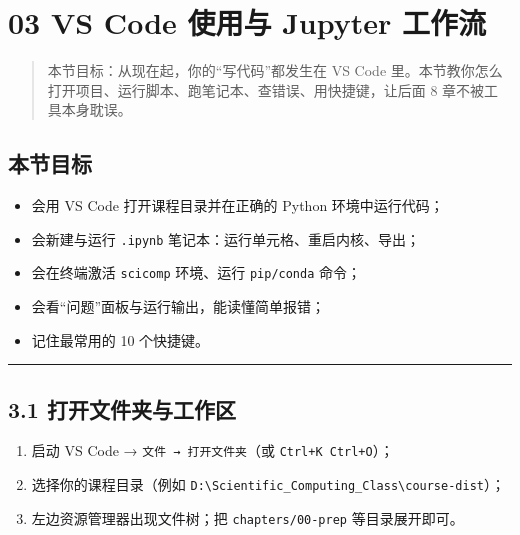 \section{03 VS Code 使用与 Jupyter
工作流}\label{vs-code-ux4f7fux7528ux4e0e-jupyter-ux5de5ux4f5cux6d41}

\begin{quote}
本节目标：从现在起，你的``写代码''都发生在 VS Code
里。本节教你怎么打开项目、运行脚本、跑笔记本、查错误、用快捷键，让后面 8
章不被工具本身耽误。
\end{quote}

\subsection{本节目标}\label{ux672cux8282ux76eeux6807-2}

\begin{itemize}
\tightlist
\item
  会用 VS Code 打开课程目录并在正确的 Python 环境中运行代码；
\item
  会新建与运行 \texttt{.ipynb} 笔记本：运行单元格、重启内核、导出；
\item
  会在终端激活 \texttt{scicomp} 环境、运行 \texttt{pip/conda} 命令；
\item
  会看``问题''面板与运行输出，能读懂简单报错；
\item
  记住最常用的 10 个快捷键。
\end{itemize}

\begin{center}\rule{0.5\linewidth}{0.5pt}\end{center}

\subsection{3.1
打开文件夹与工作区}\label{ux6253ux5f00ux6587ux4ef6ux5939ux4e0eux5de5ux4f5cux533a}

\begin{enumerate}
\def\labelenumi{\arabic{enumi}.}
\tightlist
\item
  启动 VS Code → \texttt{文件\ →\ 打开文件夹}（或
  \texttt{Ctrl+K\ Ctrl+O}）；
\item
  选择你的课程目录（例如
  \texttt{D:\textbackslash{}Scientific\_Computing\_Class\textbackslash{}course-dist}）；
\item
  左边资源管理器出现文件树；把 \texttt{chapters/00-prep}
  等目录展开即可。
\end{enumerate}


